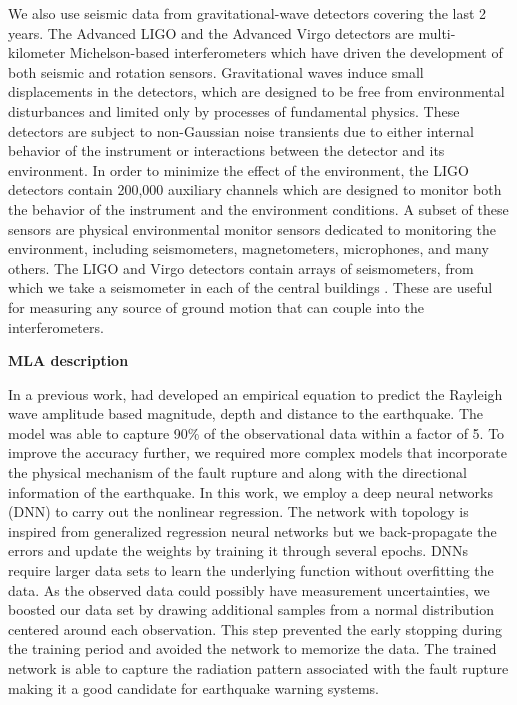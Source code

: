 \documentclass[preprint, aps, showpacs]{revtex4-1}
\begin{document}
We also use seismic data from gravitational-wave detectors covering the last 2 years.
The Advanced LIGO \cite{aligo} and the Advanced Virgo \cite{avirgo}  detectors are multi-kilometer Michelson-based interferometers which have driven the development of both seismic \cite{BeCa2016} and rotation \cite{VeHa2014} sensors.
Gravitational waves induce small displacements in the detectors, which are designed to be free from environmental disturbances and limited only by processes of fundamental physics.
These detectors are subject to non-Gaussian noise transients due to either internal behavior of the instrument or interactions between the detector and its environment. In order to minimize the effect of the environment, the LIGO detectors contain 200,000 auxiliary channels which are designed to monitor both the behavior of the instrument and the environment conditions.
A subset of these sensors are physical environmental monitor sensors dedicated to monitoring the environment, including seismometers, magnetometers, microphones, and many others.
The LIGO and Virgo detectors contain arrays of seismometers, from which we take a seismometer in each of the central buildings \cite{AbEA2016f}. These are useful for measuring any source of ground motion that can couple into the interferometers.

\textbf{MLA description}

In a previous work, \cite{CoEa2017} had developed an empirical equation to predict the Rayleigh wave amplitude based magnitude, depth and distance to the earthquake. The model was able to capture 90\% of the observational data within a factor of 5. To improve the accuracy further, we required more complex models that incorporate the physical mechanism of the fault rupture and along with the directional information of the earthquake. 
In this work, we employ a deep neural networks (DNN) to carry out the nonlinear regression. The network with topology is inspired from generalized regression neural networks but we back-propagate the errors and update the weights by training it through several epochs.   DNNs require larger data sets to learn the underlying function without overfitting the data. As the observed data could possibly have measurement uncertainties, we boosted our data set by drawing additional samples from a normal distribution centered around each observation. This step prevented the early stopping during the training period and avoided the network to memorize the data.  The trained network is able to capture the radiation pattern associated with the fault rupture making it a good candidate for earthquake warning systems. 
\end{document}
